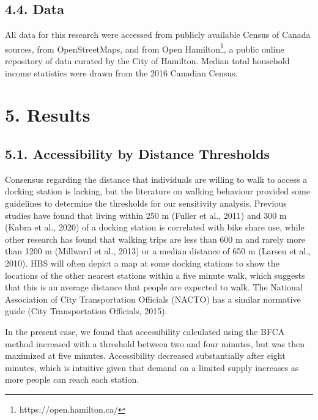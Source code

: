 \documentclass[]{elsarticle} %
\begin{document}
\hypertarget{data}{%
\subsection{4.4. Data}\label{data}}

All data for this research were accessed from publicly available Census
of Canada sources, from OpenStreetMaps, and from Open
Hamilton\footnote{https://open.hamilton.ca/}, a public online repository
of data curated by the City of Hamilton. Median total household income
statistics were drawn from the 2016 Canadian Census.

\hypertarget{results}{%
\section{5. Results}\label{results}}

\hypertarget{accessibility-by-distance-thresholds}{%
\subsection{5.1. Accessibility by Distance
Thresholds}\label{accessibility-by-distance-thresholds}}

Consensus regarding the distance that individuals are willing to walk to
access a docking station is lacking, but the literature on walking
behaviour provided some guidelines to determine the thresholds for our
sensitivity analysis. Previous studies have found that living within 250
m (Fuller et al., 2011) and 300 m (Kabra et al., 2020) of a docking
station is correlated with bike share use, while other research has
found that walking trips are less than 600 m and rarely more than 1200 m
(Millward et al., 2013) or a median distance of 650 m (Larsen et al.,
2010). HBS will often depict a map at some docking stations to show the
locations of the other nearest stations within a five minute walk, which
suggests that this is an average distance that people are expected to
walk. The National Association of City Transportation Officials (NACTO)
has a similar normative guide (City Transportation Officials, 2015).

In the present case, we found that accessibility calculated using the
BFCA method increased with a threshold between two and four minutes, but
was then maximized at five minutes. Accessibility decreased
substantially after eight minutes, which is intuitive given that demand
on a limited supply increases as more people can reach each station.
\end{document}

